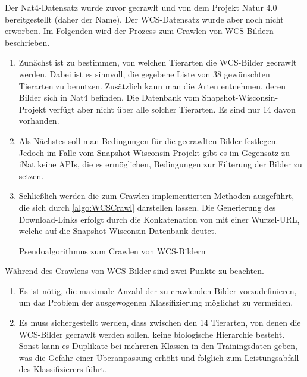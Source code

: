 Der Nat4-Datensatz wurde zuvor gecrawlt und von dem Projekt Natur 4.0 bereitgestellt (daher der Name). Der WCS-Datensatz wurde aber noch nicht erworben. Im Folgenden wird der Prozess zum Crawlen von WCS-Bildern beschrieben.

\begin{enumerate}
	\item Zunächst ist zu bestimmen, von welchen Tierarten die WCS-Bilder gecrawlt werden. Dabei ist es sinnvoll, die gegebene Liste von 38 gewünschten Tierarten zu benutzen. Zusätzlich kann man die Arten entnehmen, deren Bilder sich in Nat4 befinden. Die Datenbank vom Snapshot-Wisconsin-Projekt verfügt aber nicht über alle solcher Tierarten. Es sind nur 14 davon vorhanden.
	
	\item Als Nächstes soll man Bedingungen für die gecrawlten Bilder festlegen. Jedoch im Falle vom Snapshot-Wisconsin-Projekt gibt es im Gegensatz zu iNat keine APIs, die es ermöglichen, Bedingungen zur Filterung der Bilder zu setzen.
	
	\item Schließlich werden die zum Crawlen implementierten Methoden ausgeführt, die sich durch \autoref{algo:WCSCrawl} darstellen lassen. Die Generierung des Download-Links erfolgt durch die Konkatenation von  mit einer Wurzel-URL, welche auf die Snapshot-Wisconsin-Datenbank deutet.
	
	\begin{algorithm}[h] 
		\caption{Pseudoalgorithmus zum Crawlen von WCS-Bildern}
		\SetAlgoLined 
		\label{algo:WCSCrawl}
	\end{algorithm}
\end{enumerate}

Während des Crawlens von WCS-Bilder sind zwei Punkte zu beachten.

\begin{enumerate}
	\item Es ist nötig, die maximale Anzahl der zu crawlenden Bilder vorzudefinieren, um das Problem der ausgewogenen Klassifizierung möglichst zu vermeiden.
	
	\item Es muss sichergestellt werden, dass zwischen den 14 Tierarten, von denen die WCS-Bilder gecrawlt werden sollen, keine biologische Hierarchie besteht. Sonst kann es Duplikate bei mehreren Klassen in den Trainingsdaten geben, was die Gefahr einer Überanpassung erhöht und folglich zum Leistungsabfall des Klassifizierers führt.
\end{enumerate}


